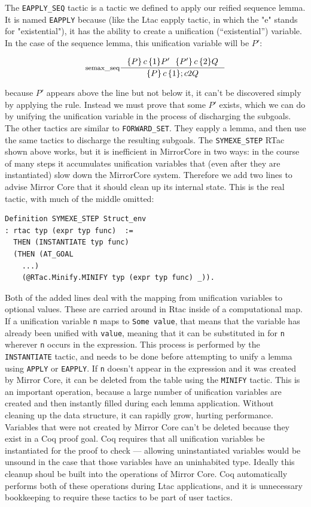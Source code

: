 \documentclass{puthesis}
\begin{document}
The \lstinline|EAPPLY_SEQ| tactic is a tactic we defined to apply our
reified sequence lemma. It is named \lstinline|EAPPLY| because (like
the Ltac eapply tactic, in which the "e" stands for "existential"), it has
the ability to create a unification (``existential'') variable. In the case of the
sequence lemma, this unification variable will be $P'$:

\[
\inference[semax\_seq]{\triple{P}c1{P'} ~~ \triple{P'}c2{Q}}
{\triple{P}c1;c2{Q}}\]

\noindent because $P'$ appears above the line but not below it, it
can't be discovered simply by applying the rule. Instead we must prove
that some $P'$ exists, which we can do by unifying the unification
variable in the process of discharging the subgoals. The other tactics
are similar to \lstinline|FORWARD_SET|. They eapply a lemma, and then
use the same tactics to discharge the resulting subgoals.  The
\lstinline|SYMEXE_STEP| RTac shown above works, but it is inefficient in
MirrorCore in two ways: in the course of many steps it
accumulates unification variables that (even after they are
instantiated) slow down the MirrorCore system.  Therefore we add
two lines to advise Mirror Core that it should clean up its internal
state.  This is the real tactic, with much of the middle omitted:

\begin{lstlisting}
Definition SYMEXE_STEP Struct_env
: rtac typ (expr typ func)  :=
  THEN (INSTANTIATE typ func)
  (THEN (AT_GOAL
    ...) 
    (@RTac.Minify.MINIFY typ (expr typ func) _)).
\end{lstlisting}


Both of the added lines deal with the mapping from unification variables to
optional values. These are carried around in Rtac inside of a
computational map. If a unification variable \lstinline|n| maps to
\lstinline|Some value|, that means that the variable has already been
unified with \lstinline|value|, meaning that it can be substituted in
for \lstinline|n| wherever \lstinline|n| occurs in the
expression. This process is performed by the \lstinline|INSTANTIATE|
tactic, and needs to be done before attempting to unify a lemma using
\lstinline|APPLY| or \lstinline|EAPPLY|. If \lstinline|n| doesn't
appear in the expression and it was created by Mirror Core, it can be
deleted from the table using the \lstinline|MINIFY| tactic. This is an
important operation, because a large number of unification variables
are created and then instantly filled during each lemma
application. Without cleaning up the data structure, it can rapidly
grow, hurting performance. Variables that were not created by Mirror
Core can't be deleted because they exist in a Coq proof goal. Coq
requires that all unification variables be instantiated for the proof
to check --- allowing uninstantiated variables would be unsound in
the case that those variables have an uninhabited type. Ideally this
cleanup shoul be built into the operations
of Mirror Core. Coq automatically performs both of these operations
during Ltac applications, and it is unnecessary bookkeeping to require
these tactics to be part of user tactics.
\end{document}
